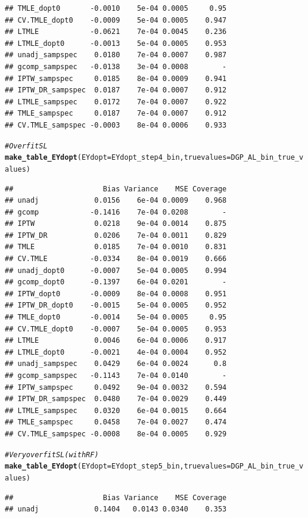 \documentclass[11pt]{article}\usepackage[]{graphicx}\usepackage[]{color}
\makeatletter
\newcommand{\hlcom}[1]{\textcolor[rgb]{0.678,0.584,0.686}{\textit{#1}}}%
\newcommand{\hlstd}[1]{\textcolor[rgb]{0.345,0.345,0.345}{#1}}%
\newcommand{\hlkwc}[1]{\textcolor[rgb]{0.333,0.667,0.333}{#1}}%
\newcommand{\hlkwd}[1]{\textcolor[rgb]{0.737,0.353,0.396}{\textbf{#1}}}%
\newenvironment{kframe}{%
 \def\at@end@of@kframe{}%
 \ifinner\ifhmode%
  \def\at@end@of@kframe{\end{minipage}}%
  \begin{minipage}{\columnwidth}%
 \fi\fi%
 \def\FrameCommand##1{\hskip\@totalleftmargin \hskip-\fboxsep
 \colorbox{shadecolor}{##1}\hskip-\fboxsep
     \hskip-\linewidth \hskip-\@totalleftmargin \hskip\columnwidth}%
 \MakeFramed {\advance\hsize-\width
   \@totalleftmargin\z@ \linewidth\hsize
   \@setminipage}}%
 {\par\unskip\endMakeFramed%
 \at@end@of@kframe}
\newenvironment{knitrout}{}{} %
\makeatother
\begin{document}
\begin{knitrout}
\begin{kframe}
\begin{verbatim}
## TMLE_dopt0       -0.0010    5e-04 0.0005     0.95
## CV.TMLE_dopt0    -0.0009    5e-04 0.0005    0.947
## LTMLE            -0.0621    7e-04 0.0045    0.236
## LTMLE_dopt0      -0.0013    5e-04 0.0005    0.953
## unadj_sampspec    0.0180    7e-04 0.0007    0.987
## gcomp_sampspec   -0.0138    3e-04 0.0008        -
## IPTW_sampspec     0.0185    8e-04 0.0009    0.941
## IPTW_DR_sampspec  0.0187    7e-04 0.0007    0.912
## LTMLE_sampspec    0.0172    7e-04 0.0007    0.922
## TMLE_sampspec     0.0187    7e-04 0.0007    0.912
## CV.TMLE_sampspec -0.0003    8e-04 0.0006    0.933
\end{verbatim}
\begin{alltt}
\hlcom{# Overfit SL}
\hlkwd{make_table_EYdopt}\hlstd{(}\hlkwc{EYdopt} \hlstd{= EYdopt_step4_bin,} \hlkwc{truevalues} \hlstd{= DGP_AL_bin_true_values)}
\end{alltt}
\begin{verbatim}
##                     Bias Variance    MSE Coverage
## unadj             0.0156    6e-04 0.0009    0.968
## gcomp            -0.1416    7e-04 0.0208        -
## IPTW              0.0218    9e-04 0.0014    0.875
## IPTW_DR           0.0206    7e-04 0.0011    0.829
## TMLE              0.0185    7e-04 0.0010    0.831
## CV.TMLE          -0.0334    8e-04 0.0019    0.666
## unadj_dopt0      -0.0007    5e-04 0.0005    0.994
## gcomp_dopt0      -0.1397    6e-04 0.0201        -
## IPTW_dopt0       -0.0009    8e-04 0.0008    0.951
## IPTW_DR_dopt0    -0.0015    5e-04 0.0005    0.952
## TMLE_dopt0       -0.0014    5e-04 0.0005     0.95
## CV.TMLE_dopt0    -0.0007    5e-04 0.0005    0.953
## LTMLE             0.0046    6e-04 0.0006    0.917
## LTMLE_dopt0      -0.0021    4e-04 0.0004    0.952
## unadj_sampspec    0.0429    6e-04 0.0024      0.8
## gcomp_sampspec   -0.1143    7e-04 0.0140        -
## IPTW_sampspec     0.0492    9e-04 0.0032    0.594
## IPTW_DR_sampspec  0.0480    7e-04 0.0029    0.449
## LTMLE_sampspec    0.0320    6e-04 0.0015    0.664
## TMLE_sampspec     0.0458    7e-04 0.0027    0.474
## CV.TMLE_sampspec -0.0008    8e-04 0.0005    0.929
\end{verbatim}
\begin{alltt}
\hlcom{# Very overfit SL (with RF)}
\hlkwd{make_table_EYdopt}\hlstd{(}\hlkwc{EYdopt} \hlstd{= EYdopt_step5_bin,} \hlkwc{truevalues} \hlstd{= DGP_AL_bin_true_values)}
\end{alltt}
\begin{verbatim}
##                     Bias Variance    MSE Coverage
## unadj             0.1404   0.0143 0.0340    0.353

\end{verbatim}
\end{kframe}
\end{knitrout}
\end{document}
